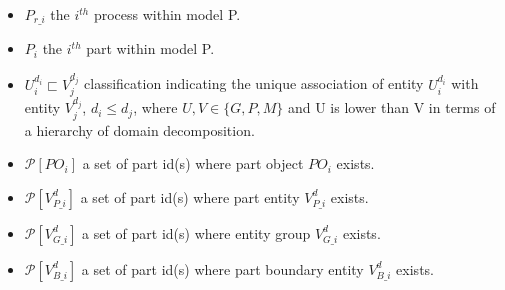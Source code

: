 \begin{itemize}
\item{$P_{r\_i}$} the $i^{th}$ process within model P. 

\item{$P_i$} the $i^{th}$ part within model P. 

\item{$U^{d_i}_i\sqsubset V^{d_j}_j$} classification indicating the
  unique association of entity $U^{d_i}_i$ with entity $V^{d_j}_j$,
  $d_i\leq d_j$, where $U,V\in\{G,P,M\}$ and U is lower than V in
  terms of a hierarchy of domain decomposition. 

\item{$\mathcal{P}[PO_i]$} a set of part id(s) where part object
  $PO_i$ exists. 

\item{$\mathcal{P}[V^d_{P\_i}]$} a set of part id(s) where part
  entity $V^d_{P\_i}$ exists. 

\item{$\mathcal{P}[V^d_{G\_i}]$} a set of part id(s) where entity
  group $V^d_{G\_i}$ exists. 

\item{$\mathcal{P}[V^d_{B\_i}]$} a set of part id(s) where part
  boundary entity $V^d_{B\_i}$ exists. 


\end{itemize}
